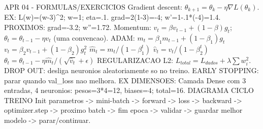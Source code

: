 APR 04 - FORMULAS/EXERCICIOS
Gradient descent: $\theta_{k+1}=\theta_k-\eta\nabla L(\theta_k)$.
EX: L(w)=(w-3)^2; w=1; eta=.1.
grad=2(1-3)=-4; w'=1-.1*(-4)=1.4.
PROXIMOS: grad=-3.2; w''=1.72.
Momentum: $v_t=\beta v_{t-1}+(1-\beta)g_t$;
$\theta_t=\theta_{t-1}-\eta v_t$ (uma convencao).
ADAM:
$m_t=\beta_1m_{t-1}+(1-\beta_1)g_t$
$v_t=\beta_2v_{t-1}+(1-\beta_2)g_t^2$
$\hat m_t=m_t/(1-\beta_1^t)$
$\hat v_t=v_t/(1-\beta_2^t)$
$\theta_t=\theta_{t-1}-\eta\hat m_t/(\sqrt{\hat v_t}+\epsilon)$
REGULARIZACAO L2: $L_{total}=L_{dados}+\lambda\sum w_i^2$.
DROP OUT: desliga neuronios aleatoriamente so no treino.
EARLY STOPPING: parar quando val_loss nao melhora.
EX DIMENSOES:
Camada Dense com 3 entradas, 4 neuronios:
pesos=3*4=12, biases=4; total=16.
DIAGRAMA CICLO TREINO
Init parametros -> mini-batch -> forward
 -> loss -> backward -> optimizer.step
 -> proximo batch -> fim epoca
 -> validar -> guardar melhor modelo
 -> parar/continuar.
